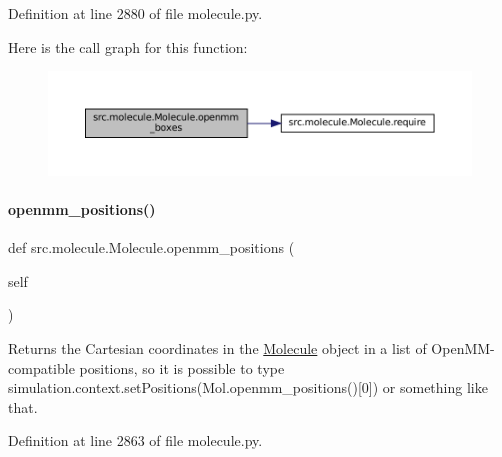 Definition at line 2880 of file molecule.\+py.

Here is the call graph for this function\+:
\nopagebreak
\begin{figure}[H]
\begin{center}
\leavevmode
\includegraphics[width=350pt]{classsrc_1_1molecule_1_1Molecule_a4afda180689c9bfde319a025f96d4c0b_cgraph}
\end{center}
\end{figure}
\mbox{\label{classsrc_1_1molecule_1_1Molecule_a466ab9dea14be9117488c6198b0f77cd}} 
\paragraph{\texorpdfstring{openmm\+\_\+positions()}{openmm\_positions()}}
{\footnotesize\ttfamily def src.\+molecule.\+Molecule.\+openmm\+\_\+positions (\begin{DoxyParamCaption}\item[{}]{self }\end{DoxyParamCaption})}



Returns the Cartesian coordinates in the \hyperlink{classsrc_1_1molecule_1_1Molecule}{Molecule} object in a list of Open\+M\+M-\/compatible positions, so it is possible to type simulation.\+context.\+set\+Positions(Mol.\+openmm\+\_\+positions()\mbox{[}0\mbox{]}) or something like that. 



Definition at line 2863 of file molecule.\+py.


